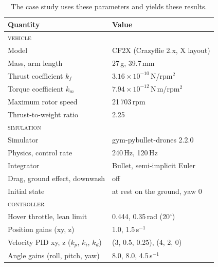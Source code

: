 \begin{table}[t]
\small
\caption{\textnormal{The case study uses these parameters and yields these results.}}
\label{tab:params-corner}
\setlength{\tabcolsep}{4pt}
\begin{tabular*}{\linewidth}{@{}l@{\extracolsep{\fill}}l@{}}
\toprule
Quantity & Value \\
\midrule
\textsc{vehicle} & \\
Model & CF2X (Crazyflie 2.x, X layout) \\
Mass, arm length & 27\,g, 39.7\,mm \\
Thrust coefficient $k_f$ & $3.16\times10^{-10}$\,N/rpm$^2$ \\
Torque coefficient $k_m$ & $7.94\times10^{-12}$\,N\,m/rpm$^2$ \\
Maximum rotor speed & 21\,703\,rpm \\
Thrust-to-weight ratio & 2.25 \\
\midrule
\textsc{simulation} & \\
Simulator & gym-pybullet-drones 2.2.0 \\
Physics, control rate & 240\,Hz, 120\,Hz \\
Integrator & Bullet, semi-implicit Euler \\
Drag, ground effect, downwash & off \\
Initial state & at rest on the ground, yaw 0 \\
\midrule
\textsc{controller} & \\
Hover throttle, lean limit & 0.444, 0.35\,rad (20$^\circ$) \\
Position gains (xy, z) & 1.0, 1.5\,s$^{-1}$ \\
Velocity PID xy, z ($k_p$, $k_i$, $k_d$) & (3, 0.5, 0.25), (4, 2, 0) \\
Angle gains (roll, pitch, yaw) & 8.0, 8.0, 4.5\,s$^{-1}$ \\

\end{tabular*}
\end{table}
